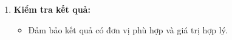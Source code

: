 \begin{phuongphap}
\begin{enumerate}
\begin{itemize}
\begin{equation}
        \end{equation}
        \item \textbf{Tính khối lượng của một phân tử ($m_0$):}
        \begin{equation}
            m_0 = \dfrac{M}{N_A}
        \end{equation}
        \item \textbf{Tính mật độ phân tử ($\mu$):}
        \begin{equation}
            \mu = \dfrac{N}{V}
        \end{equation}
        Hoặc, nếu biết khối lượng riêng ($D$) và khối lượng mol ($M$):
        \begin{equation}
            \mu = \dfrac{D \cdot N_A}{M}
        \end{equation}
    \end{itemize}
    \item \textbf{Kiểm tra kết quả:}
    \begin{itemize}
        \item Đảm bảo kết quả có đơn vị phù hợp và giá trị hợp lý.
    \end{itemize}
\end{enumerate}
\end{phuongphap}

